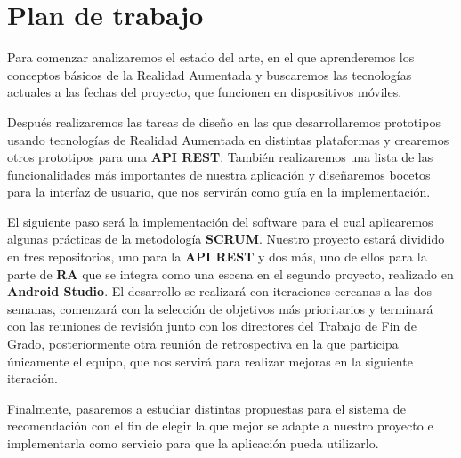 \newpage
\section{Plan de trabajo}
\begin{flushleft}
    Para comenzar analizaremos el estado del arte, en el que aprenderemos los conceptos
     básicos de la Realidad Aumentada y buscaremos las tecnologías actuales a las fechas del proyecto,
     que funcionen en dispositivos móviles.
\end{flushleft}

\begin{flushleft}     
    Después realizaremos las tareas de diseño en las que desarrollaremos prototipos usando
     tecnologías de Realidad Aumentada en distintas plataformas y crearemos otros prototipos para una \textbf{API REST}.
     También realizaremos una lista de las funcionalidades más importantes de nuestra aplicación
     y diseñaremos bocetos para la interfaz de usuario, que nos servirán como guía en
     la implementación.
\end{flushleft}

\begin{flushleft}    
    El siguiente paso será la implementación del software para el cual aplicaremos
     algunas prácticas de la metodología \textbf{SCRUM}. Nuestro proyecto estará dividido en tres repositorios, uno para la
     \textbf{API REST} y dos más, uno de ellos para la parte de \textbf{RA} que se integra como una
     escena en el segundo proyecto, realizado en \textbf{Android Studio}. El desarrollo se realizará
     con iteraciones cercanas a las dos semanas, comenzará con la selección de
     objetivos más prioritarios y terminará con las reuniones de revisión junto
     con los directores del Trabajo de Fin de Grado, posteriormente otra reunión de retrospectiva en
     la que participa únicamente el equipo, que nos servirá para realizar mejoras en la
     siguiente iteración.
\end{flushleft}

\begin{flushleft}
    Finalmente, pasaremos a estudiar distintas propuestas para el sistema
     de recomendación con el fin de elegir la que mejor se adapte a nuestro
     proyecto e implementarla como servicio para que la aplicación pueda
     utilizarlo.
\end{flushleft}

\label{makereference1.3}



